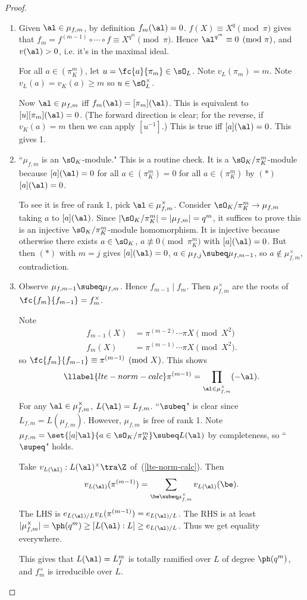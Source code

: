 \begin{proof}
\begin{enumerate}
\item
Given $\al\in \mu_{f,m}$, by definition $f_m(\al)=0$. $f(X)\equiv X^q\pmod{\pi}$ gives that $f_m=f^{(m-1)}\circ \cdots \circ f\equiv X^{q^m}\pmod{\pi}$. Hence $\al^{q^m}\equiv 0\pmod{\pi}$, and $v(\al)>0$, i.e. it's in the maximal ideal.

For all $a\in (\pi_K^m)$, let $u=\fc{a}{\pi_m}\in \sO_L$. Note $v_L(\pi_m)=m$. %
Note $v_L(a)=v_K(a)\ge m$ so $u\in \sO_L^{\times}$.

Now $\al\in \mu_{f,m}$ iff $f_m(\al)=[\pi_m](\al)$. This is equivalent to $[u][\pi_m](\al)=0$. (The forward direction is clear; for the reverse, if $v_K(a)=m$ then we can apply $[u^{-1}]$.) This is true iff $[a](\al)=0$. This gives 1.
\item ``$\mu_{f,m}$ is an $\sO_K$-module." This is a routine check. It is a $\sO_K/\pi_K^m$-module because $[a](\al)=0$ for all $a\in (\pi_K^m)=0$ for all $a\in (\pi_K^m)$ by $(*)$ $[a](\al)=0$.

To see it is free of rank 1, pick $\al \in \mu_{f,m}^{\times}$. Consider $\sO_K/\pi_K^m\to \mu_{f,m}$ taking $a$ to $[a](\al)$. Since $|\sO_K/\pi_K^m|=|\mu_{f,m}|=q^m$, it suffices to prove this is an injective $\sO_K/\pi_K^m$-module homomorphism. It is injective because otherwise there exists $a\in \sO_K$, $a\nequiv 0\pmod{\pi_K^m}$ with $[a](\al)=0$. But then  $(*)$ with $m=j$ gives $[a](\al)=0$, $a\in \mu_{f,j}\subeq \mu_{f,m-1}$, so $a\nin \mu_{f,m}^{\times}$, contradiction. 
\item
Observe $\mu_{f,m-1}\subeq \mu_{f,m}$. %
Hence $f_{m-1}\mid f_m$. Then $\mu_{f,m}^{\times}$ are the roots of $\fc{f_m}{f_{m-1}}=f_m^{\times}$.

Note 
\begin{align*}
f_{m-1}(X)&=\pi^{(m-2)}\cdots \pi X\pmod{X^2}\\
f_m(X)&=\pi^{(m-1)}\cdots \pi X\pmod{X^2}.
\end{align*}
so $\fc{f_m}{f_{m-1}}\equiv \pi^{(m-1)}\pmod{X}$. This shows
\begin{equation}\llabel{lte-norm-calc}
\pi^{(m-1)}=\prod_{\al\in \mu_{f,m}^{\times}}(-\al).
\end{equation}
For any $\al\in \mu_{f,m}^{\times}$, $L(\al)=L_{f,m}$. ``$\subeq$" is clear since $L_{f,m}=L(\mu_{f,m})$.
However, $\mu_{f,m}$ is free of rank 1. Note $\mu_{f,m}=\set{[a]\al}{a\in \sO_K/\pi_K^m}\subeq L(\al)$ by completeness, so ``$\supeq$" holds.

Take $v_{L(\al)}:L(\al)^{\times}\tra \Z$ of~(\ref{lte-norm-calc}). Then
\[
v_{L(\al)}(\pi^{(m-1)})=\sum_{\be\subeq \mu_{f,m}^{\times}}v_{L(\al)}(\be).
\]
The LHS is $e_{L(\al)/L}v_L(\pi^{(m-1)})=e_{L(\al)/L}$. The RHS is at least $|\mu_{f,m}^{\times}|=\ph(q^m)\ge [L(\al):L]\ge e_{L(\al)/L}$. Thus we get equality everywhere.

This gives that $L(\al)=L_f^m$ is totally ramified over $L$ of degree $\ph(q^m)$, and $f_m^{\times}$ is irreducible over $L$.
\end{enumerate}
\end{proof}
